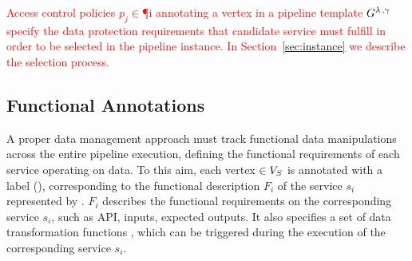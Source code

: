 \textcolor{red}{Access control policies $p_j$$\in$\P{i} annotating a vertex  in a pipeline template $G^{\lambda\,,\gamma\,}$ specify the data protection requirements that candidate service must fulfill in order to be selected in the pipeline instance. In Section~\ref{sec:instance} we describe the selection process.}


    \subsection{Functional Annotations}\label{sec:funcannotation}
    A proper data management approach must track functional data manipulations across the entire pipeline execution, defining the functional requirements of each service operating on data.
    To this aim, each vertex $\in V_S$ is annotated with a label \myGamma(), corresponding to the functional description $F_i$ of the service $s_i$ represented by .
    $F_i$ describes the functional requirements on the corresponding service $s_i$, such as API, inputs, expected outputs.
    It also specifies a set \TF{} of data transformation functions , which can be triggered during the execution of the corresponding service $s_i$.

